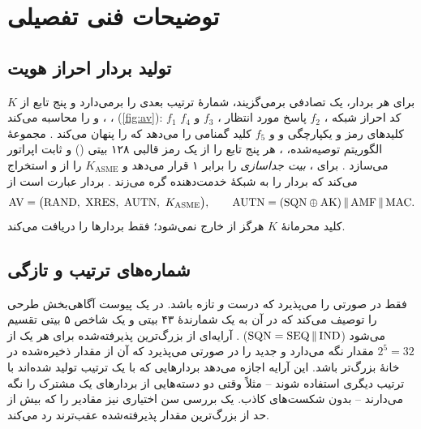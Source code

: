 \documentclass[11pt,a4paper]{article}
\begin{document}
\section{توضیحات فنی تفصیلی}

\subsection{تولید بردار احراز هویت}
برای هر بردار،  یک  تصادفی برمی‌گزیند، شمارهٔ ترتیب بعدی  را برمی‌دارد و پنج تابع از
$K$، ،  و  را محاسبه می‌کند (\cref{fig:av}): $f_1$ کد احراز شبکه ، $f_2$ پاسخ
مورد انتظار ، $f_3$ و $f_4$ کلیدهای رمز و یکپارچگی  و  و $f_5$ کلید گمنامی  را می‌دهد که
 را پنهان می‌کند \cite{ts33102}. مجموعهٔ الگوریتم توصیه‌شده، ، هر پنج تابع را از یک رمز قالبی
۱۲۸ بیتی () و ثابت اپراتور  می‌سازد \cite{ts35206}. برای ،  \emph{بیت جداسازی
} را برابر ۱ قرار می‌دهد و $K_{\mathrm{ASME}}$ را از  و  استخراج می‌کند که بردار را به شبکهٔ
خدمت‌دهنده گره می‌زند \cite{ts33401}. بردار عبارت است از
\begin{equation}\label{eq:autn}
  \mathrm{AV} = \bigl(\mathrm{RAND},\ \mathrm{XRES},\ \mathrm{AUTN},\ K_{\mathrm{ASME}}\bigr),\qquad
  \mathrm{AUTN} = (\mathrm{SQN}\xor\mathrm{AK})\concat\mathrm{AMF}\concat\mathrm{MAC}.
\end{equation}
کلید محرمانهٔ $K$ هرگز از  خارج نمی‌شود؛  فقط بردارها را دریافت می‌کند.

\begin{acnfigure}
  \caption{تولید بردار احراز هویت در  با توابع $f_1$ تا $f_5$.}
  \label{fig:av}
\end{acnfigure}

\subsection{شماره‌های ترتیب و تازگی}
 فقط در صورتی  را می‌پذیرد که  درست \emph{و}  تازه باشد.  در یک
پیوست آگاهی‌بخش طرحی را توصیف می‌کند که در آن  به یک شمارندهٔ ۴۳ بیتی  و یک شاخص ۵ بیتی
 تقسیم می‌شود ($\mathrm{SQN} = \mathrm{SEQ}\,\Vert\,\mathrm{IND}$) \cite{ts33102}.  آرایه‌ای از
بزرگ‌ترین  پذیرفته‌شده برای هر یک از $2^5 = 32$ مقدار  نگه می‌دارد و  جدید را در صورتی
می‌پذیرد که  آن از مقدار ذخیره‌شده در خانهٔ  بزرگ‌تر باشد. این آرایه اجازه می‌دهد بردارهایی که با
یک ترتیب تولید شده‌اند با ترتیب دیگری استفاده شوند -- مثلاً وقتی دو  دسته‌هایی از بردارهای یک مشترک را نگه
می‌دارند -- بدون شکست‌های کاذب. یک بررسی سن اختیاری نیز مقادیر  را که بیش از حد از بزرگ‌ترین مقدار
پذیرفته‌شده عقب‌ترند رد می‌کند.
\end{document}
